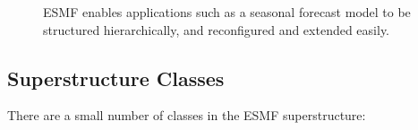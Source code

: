 \begin{center}
\begin{figure}
\caption{ESMF enables applications such as a seasonal forecast
model to be structured hierarchically, and reconfigured and 
extended easily.}
\label{fig:appunit}
\end{figure}
\end{center}

\subsection{Superstructure Classes}

There are a small number of classes in the ESMF superstructure:


